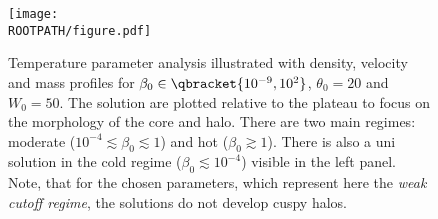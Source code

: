 \begin{figure}%
	\centering%
	\texttt{[image: \\ROOTPATH/figure.pdf]}
	\caption{Temperature parameter analysis illustrated with density, velocity and mass profiles for $\beta_0\in\qbracket{10^{-9},10^{2}}$, $\theta_0 = 20$ and $W_0 = 50$. The solution are plotted relative to the plateau to focus on the morphology of the core and halo. There are two main regimes: moderate ($10^{-4} \lesssim\beta_0 \lesssim 1$) and hot ($\beta_0 \gtrsim 1$). There is also a uni solution in the cold regime ($\beta_0 \lesssim 10^{-4}$) visible in the left panel. Note, that for the chosen parameters, which represent here the \textit{weak cutoff regime}, the solutions do not develop cuspy halos.}%
	\label{fig:profile:with-cutoff:beta0-weak:plat}%
\end{figure}